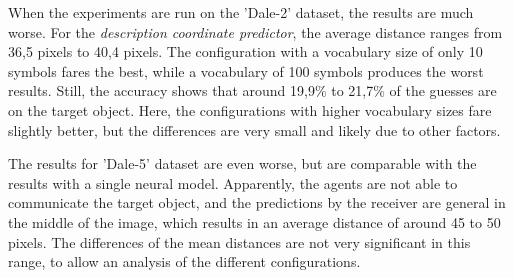 When the experiments are run on the 'Dale-2' dataset, the results are much worse.
For the \emph{description coordinate predictor}, the average distance ranges from 36,5 pixels to 40,4 pixels.
The configuration with a vocabulary size of only 10 symbols fares the best, while a vocabulary of 100 symbols produces the worst results.
Still, the accuracy shows that around 19,9\% to 21,7\% of the guesses are on the target object.
Here, the configurations with higher vocabulary sizes fare slightly better, but the differences are very small and likely due to other factors.

The results for 'Dale-5' dataset are even worse, but are comparable with the results with a single neural model.
Apparently, the agents are not able to communicate the target object, and the predictions by the receiver are general in the middle of the image, which results in an average distance of around 45 to 50 pixels.
The differences of the mean distances are not very significant in this range, to allow an analysis of the different configurations.

